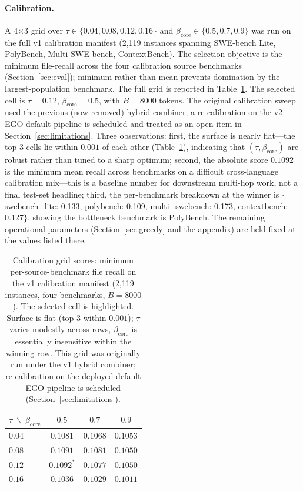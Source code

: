 \documentclass[11pt, a4paper]{article}
\begin{document}
\paragraph{Calibration.} A 4$\times$3 grid over $\tau \in \{0.04, 0.08, 0.12, 0.16\}$ and $\beta_{\mathrm{core}} \in \{0.5, 0.7, 0.9\}$ was run on the full v1 calibration manifest (2{,}119 instances spanning SWE-bench Lite, PolyBench, Multi-SWE-bench, ContextBench). The selection objective is the minimum file-recall across the four calibration source benchmarks (Section~\ref{sec:eval}); minimum rather than mean prevents domination by the largest-population benchmark. The full grid is reported in Table~\ref{tab:calibration-grid}. The selected cell is $\tau{=}0.12$, $\beta_{\mathrm{core}}{=}0.5$, with $B{=}8000$ tokens. The original calibration sweep used the previous (now-removed) hybrid combiner; a re-calibration on the v2 EGO-default pipeline is scheduled and treated as an open item in Section~\ref{sec:limitations}. Three observations: first, the surface is nearly flat---the top-3 cells lie within $0.001$ of each other (Table~\ref{tab:calibration-grid}), indicating that $(\tau, \beta_{\mathrm{core}})$ are robust rather than tuned to a sharp optimum; second, the absolute score $0.1092$ is the minimum mean recall across benchmarks on a difficult cross-language calibration mix---this is a baseline number for downstream multi-hop work, not a final test-set headline; third, the per-benchmark breakdown at the winner is $\{$swebench\_lite: 0.133, polybench: 0.109, multi\_swebench: 0.173, contextbench: 0.127$\}$, showing the bottleneck benchmark is PolyBench. The remaining operational parameters (Section~\ref{sec:greedy} and the appendix) are held fixed at the values listed there.

\begin{table}[h]
\centering
\caption{Calibration grid scores: minimum per-source-benchmark file recall on the v1 calibration manifest (2{,}119 instances, four benchmarks, $B{=}8000$). The selected cell is highlighted. Surface is flat (top-3 within $0.001$); $\tau$ varies modestly across rows, $\beta_{\mathrm{core}}$ is essentially insensitive within the winning row. This grid was originally run under the v1 hybrid combiner; re-calibration on the deployed-default EGO pipeline is scheduled (Section~\ref{sec:limitations}).}
\label{tab:calibration-grid}
\begin{tabular}{lccc}
\toprule
$\tau \; \backslash \; \beta_{\mathrm{core}}$ & $0.5$ & $0.7$ & $0.9$ \\
\midrule
$0.04$ & $0.1081$ & $0.1068$ & $0.1053$ \\
$0.08$ & $0.1091$ & $0.1081$ & $0.1050$ \\
$0.12$ & $\mathbf{0.1092^\ast}$ & $0.1077$ & $0.1050$ \\
$0.16$ & $0.1036$ & $0.1029$ & $0.1011$ \\
\bottomrule
\end{tabular}
\end{table}
\end{document}
